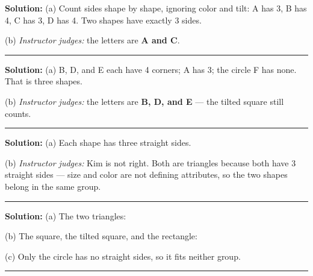 \documentclass[12pt]{article}
\begin{document}



\textbf{Solution:} (a) Count sides shape by shape, ignoring color and tilt:
A has 3, B has 4, C has 3, D has 4. Two shapes have exactly 3 sides. 

(b) \emph{Instructor judges:} the letters are \textbf{A and C}.

\vspace{0.2cm}\noindent\rule{\linewidth}{0.2pt}\vspace{0.1cm}


\textbf{Solution:} (a) B, D, and E each have 4 corners; A has 3; the circle
F has none. That is three shapes. 

(b) \emph{Instructor judges:} the letters are \textbf{B, D, and E} --- the
tilted square still counts.

\vspace{0.2cm}\noindent\rule{\linewidth}{0.2pt}\vspace{0.1cm}


\textbf{Solution:} (a) Each shape has three straight sides. 

(b) \emph{Instructor judges:} Kim is not right. Both are triangles because
both have 3 straight sides --- size and color are not defining attributes,
so the two shapes belong in the same group.

\vspace{0.2cm}\noindent\rule{\linewidth}{0.2pt}\vspace{0.1cm}


\textbf{Solution:} (a) The two triangles: 

(b) The square, the tilted square, and the rectangle: 

(c) Only the circle has no straight sides, so it fits neither group. 

\vspace{0.2cm}\noindent\rule{\linewidth}{0.2pt}\vspace{0.1cm}
\end{document}
